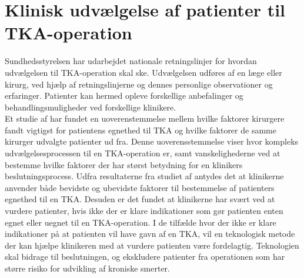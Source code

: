 \section{Klinisk udvælgelse af patienter til TKA-operation}
Sundhedsstyrelsen har udarbejdet nationale retningslinjer for hvordan udvælgelsen til TKA-operation skal ske. Udvælgelsen udføres af en læge eller kirurg, ved hjælp af retningslinjerne og dennes personlige observationer og erfaringer. Patienter kan hermed opleve forskellige anbefalinger og behandlingsmuligheder ved forskellige klinikere. \citep{brostrom2012} \\
Et studie af  har fundet en uoverenstemmelse mellem hvilke faktorer kirurgere fandt vigtigst for patientens egnethed til TKA og hvilke faktorer de samme kirurger udvalgte patienter ud fra. Denne uoverensstemmelse viser hvor kompleks udvælgelsesprocessen til en TKA-operation er, samt vanskelighederne ved at bestemme hvilke faktorer der har størst betydning for en klinikers beslutningsprocess. Udfra resultaterne fra studiet af  antydes det at klinikerne anvender både bevidste og ubevidste faktorer til bestemmelse af patienters egnethed til en TKA. Desuden er det fundet at klinikerne har svært ved at vurdere patienter, hvis ikke der er klare indikationer som gør patienten enten egnet eller uegnet til en TKA-operation. 
I de tilfælde hvor der ikke er klare indikationer på at patienten vil have gavn af en TKA, vil en teknologisk metode der kan hjælpe klinikeren med at vurdere patienten være fordelagtig. Teknologien skal bidrage til beslutningen, og ekskludere patienter fra operationen som har større risiko for udvikling af kroniske smerter.

